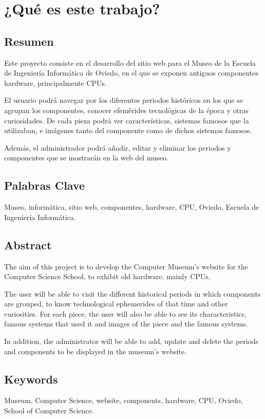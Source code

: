 \newpage
\hypersetup{pageanchor=true}

\newpage
\thispagestyle{empty}
\chapter{¿Qué es este trabajo?}
\section{Resumen}
Este proyecto consiste en el desarrollo del sitio web para el Museo de la Escuela de Ingeniería Informática de Oviedo, en el que se exponen antiguos componentes hardware, principalmente CPUs.
\par El usuario podrá navegar por los diferentes periodos históricos en los que se agrupan los componentes, conocer efemérides tecnológicas de la época y otras curiosidades. De cada pieza podrá ver características, sistemas famosos que la utilizaban, e imágenes tanto del componente como de dichos sistemas famosos.
\par Además, el administrador podrá añadir, editar y eliminar los periodos y componentes que se mostrarán en la web del museo.
\newpage
\section{Palabras Clave}
Museo, informática, sitio web, componentes, hardware, CPU, Oviedo, Escuela de Ingeniería Informática.
\pagestyle{fancy}
\newpage
\section{Abstract}
The aim of this project is to develop the Computer Museum's website for the Computer Science School, to exhibit old hardware, mainly CPUs.
\par The user will be able to visit the different historical periods  in which components are grouped, to know technological ephemerides of that time and other curiosities. For each piece, the user will also be able to see its characteristics, famous systems that used it and images of the piece and the famous systems.
\par In addition, the administrator will be able to add, update and delete the periods and components to be displayed in the museum's website.
\pagestyle{fancy}
\newpage
\section{Keywords}
Museum, Computer Science, website, components, hardware, CPU, Oviedo, School of Computer Science.